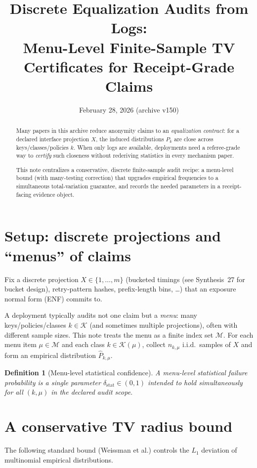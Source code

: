 \documentclass[11pt]{article}
\title{Discrete Equalization Audits from Logs:\\
\large Menu-Level Finite-Sample TV Certificates for Receipt-Grade Claims}
\author{}
\date{February 28, 2026 (archive v150)}
\newtheorem{definition}{Definition}
\begin{document}
\maketitle

\begin{abstract}
Many papers in this archive reduce anonymity claims to an \emph{equalization contract}:
for a declared interface projection $X$, the induced distributions $P_k$ are close across keys/classes/policies $k$.
When only logs are available, deployments need a referee-grade way to \emph{certify} such closeness without rederiving statistics in every mechanism paper.

This note centralizes a conservative, discrete finite-sample audit recipe:
a menu-level bound (with many-testing correction) that upgrades empirical frequencies to a simultaneous
total-variation guarantee, and records the needed parameters in a receipt-facing evidence object.
\end{abstract}

\section{Setup: discrete projections and ``menus'' of claims}
Fix a discrete projection $X\in\{1,\dots,m\}$ (bucketed timings (see Synthesis~27 for bucket design),\cite{series:bucketdesign}  retry-pattern hashes, prefix-length bins, \dots)
that an exposure normal form (ENF) commits to. \cite{series:traceifaces}

A deployment typically audits not one claim but a \emph{menu}:
many keys/policies/classes $k\in\mathcal K$ (and sometimes multiple projections),
often with different sample sizes.
This note treats the menu as a finite index set $\mathcal M$.
For each menu item $\mu\in\mathcal M$ and each class $k\in\mathcal K(\mu)$, collect $n_{k,\mu}$ i.i.d.\ samples of $X$
and form an empirical distribution $\widehat P_{k,\mu}$.

\begin{definition}[Menu-level statistical confidence]
A \emph{menu-level} statistical failure probability is a single parameter $\delta_{\mathrm{stat}}\in(0,1)$
intended to hold \emph{simultaneously} for all $(k,\mu)$ in the declared audit scope.
\end{definition}

\section{A conservative TV radius bound}
The following standard bound (Weissman et al.) controls the $L_1$ deviation of multinomial empirical distributions. \cite{Weissman2003L1}
\end{document}
